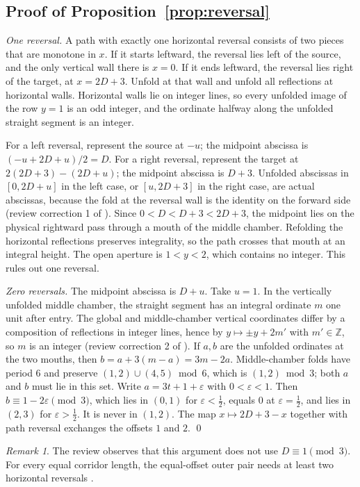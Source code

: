\documentclass[11pt]{article}
\theoremstyle{definition}
\theoremstyle{remark}
\newtheorem{remark}{Remark}
\newcommand{\Z}{\mathbb Z}
\begin{document}
\subsection{Proof of Proposition~\ref{prop:reversal}}
\emph{One reversal.} A path with exactly one horizontal reversal consists of two
pieces that are monotone in $x$. If it starts leftward, the reversal lies left
of the source, and the only vertical wall there is $x=0$. If it ends leftward,
the reversal lies right of the target, at $x=2D+3$. Unfold at that wall and
unfold all reflections at horizontal walls. Horizontal walls lie on integer
lines, so every unfolded image of the row $y=1$ is an odd integer, and the
ordinate halfway along the unfolded straight segment is an integer.

For a left reversal, represent the source at $-u$; the midpoint abscissa is
$(-u+2D+u)/2=D$. For a right reversal, represent the target at
$2(2D+3)-(2D+u)$; the midpoint abscissa is $D+3$. Unfolded abscissas in
$[0,2D+u]$ in the left case, or $[u,2D+3]$ in the right case, are actual
abscissas, because the fold at the reversal wall is the identity on the forward
side (review correction 1 of \cite{d200}). Since $0<D<D+3<2D+3$, the midpoint
lies on the physical rightward pass through a mouth of the middle chamber.
Refolding the horizontal reflections preserves integrality, so the path
crosses that mouth at an integral height. The open aperture is $1<y<2$, which
contains no integer. This rules out one reversal.

\emph{Zero reversals.} The midpoint abscissa is $D+u$. Take $u=1$. In the
vertically unfolded middle chamber, the straight segment has an integral
ordinate $m$ one unit after entry. The global and middle-chamber vertical
coordinates differ by a composition of reflections in integer lines, hence by
$y\mapsto\pm y+2m'$ with $m'\in\Z$, so $m$ is an integer (review correction 2 of
\cite{d200}). If $a,b$ are the unfolded ordinates at the two mouths, then
$b=a+3(m-a)=3m-2a$. Middle-chamber folds have period 6 and preserve
$(1,2)\cup(4,5)\bmod 6$, which is $(1,2)\bmod 3$; both $a$ and $b$ must lie in
this set. Write $a=3t+1+\varepsilon$ with $0<\varepsilon<1$. Then
$b\equiv 1-2\varepsilon\pmod 3$, which lies in $(0,1)$ for
$\varepsilon<\tfrac12$, equals $0$ at $\varepsilon=\tfrac12$, and lies in
$(2,3)$ for $\varepsilon>\tfrac12$. It is never in $(1,2)$. The map
$x\mapsto 2D+3-x$ together with path reversal exchanges the offsets $1$ and
$2$. \qed

\begin{remark}
The review observes that this argument does not use $D\equiv 1\pmod 3$. For
every equal corridor length, the equal-offset outer pair needs at least two
horizontal reversals \cite{d200}.
\end{remark}
\end{document}
